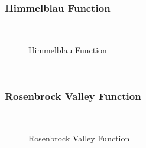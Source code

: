 \subsubsection{Himmelblau Function}
~
\begin{figure}[ht]
	\centering
	\setlength \fboxsep{0pt}
	\setlength \fboxrule{0.5pt}
	\caption{Himmelblau Function}
	\label{fig:HimmelblaueGraph}
\end{figure}
~
\subsubsection{Rosenbrock Valley Function}
~
\begin{figure}[ht]
	\centering
	\setlength \fboxsep{0pt}
	\setlength \fboxrule{0.5pt}
	\caption{Rosenbrock Valley Function}
	\label{fig:Rosenbrock}
\end{figure}
~
